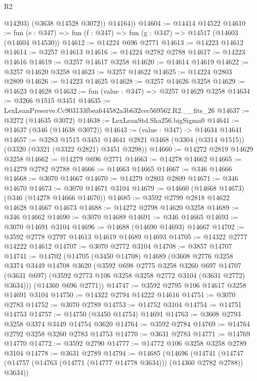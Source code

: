 \begin{lexlean}{R2}
\begin{coremodule}
            @14203)
          (@3638 @14528 @3072))
        @14164))
@14604 := @14414 @14522
@14610 := fun (e : @347) => fun (f : @347) => fun (g : @347) => @14517 (@14603 (@14604 @14530))
@14612 := @14224 @696 @2771
@14613 := @14223 @14612
@14614 := @3257 @14613
@14616 := @14224 @2782 @2788
@14617 := @14223 @14616
@14619 := @3257 @14617 @3258
@14620 := @14614 @14619
@14622 := @3257 @14620 @3258
@14623 := @3257 @14622
@14625 := @14224 @2803 @2809
@14626 := @14223 @14625
@14628 := @3257 @14626 @3258
@14629 := @14623 @14628
@14632 := fun (value : @347) => @3257 @14629 @3258
@14634 := @3266 @1515 @3451
@14635 := LexLeanPreserve.Cc903133fbea644582a3b632cec569562.R2.__fits_26
@14637 := @3272 (@14635 @3072)
@14638 := LexLeanStd.Sha256.bigSigma0
@14641 := @14637 (@346 (@14638 @3072))
@14643 := (value : @347) -> @14634 @14641
@14657 := @3283
    @1515
    @3451
    @14641
    @2821
    @3468
    (@3304 (@3314 @1515))
    (@3320 (@3321 (@3322 @2821) @3451 @3298))
@14660 := @14272 @2819 @14629 @3258
@14662 := @14279 @696 @2771
@14663 := @14278 @14662
@14665 := @14279 @2782 @2788
@14666 := @14663 @14665
@14667 := @346 @14666
@14668 := @3070 @14667
@14670 := @14279 @2803 @2809
@14671 := @346 @14670
@14673 := @3070 @14671 @3104
@14679 := @14660 (@14668 @14673) (@346 (@14278 @14666 @14670))
@14685 := @3592 @2799 @2818 @14622 @14628 @14667 @14673
@14688 := @14272 @2798 @14620 @3258
@14689 := @346 @14662
@14690 := @3070 @14689
@14691 := @346 @14665
@14693 := @3070 @14691 @3104
@14696 := @14688 (@14690 @14693) @14667
@14702 := @3592 @2778 @2797 @14613 @14619 @14689 @14693
@14705 := @14322 @2777 @14222 @14612
@14707 := @3070 @2772 @3104
@14708 := @3857 @14707
@14741 := @14702
    (@14705
      (@3450 @14708)
      @14689
      (@3608
        @2776
        @3258
        @3374
        @3449
        @14708
        @3620
        (@3592
          @698
          @2775
          @3258
          @3260
          @697
          @14707
          (@3631 @697)
          (@3592 @2773 @106 @3258 @3258 @2772 @3104 (@3631 @2772) @3634)))
      (@14360 @696 @2771))
@14747 := @3592 @2795 @106 @14617 @3258 @14691 @3104
@14750 := @14322 @2794 @14222 @14616
@14751 := @3070 @2783
@14752 := @3070 @2789
@14753 := @14752 @3104
@14754 := @14751 @14753
@14757 := @14750 (@3450 @14754) @14691
@14763 := @3608 @2793 @3258 @3374 @3449 @14754 @3620
@14764 := @3592 @2784
@14769 := @14764 @2792 @3258 @3260 @2783 @14753
@14770 := @3631 @2783
@14771 := @14769 @14770
@14772 := @3592 @2790
@14777 := @14772 @106 @3258 @3258 @2789 @3104
@14778 := @3631 @2789
@14794 := @14685
    (@14696
      (@14741 (@14747 (@14757 (@14763 (@14771 (@14777 @14778 @3634))) (@14360 @2782 @2788)) @3634))

\end{coremodule}
\end{lexlean}
